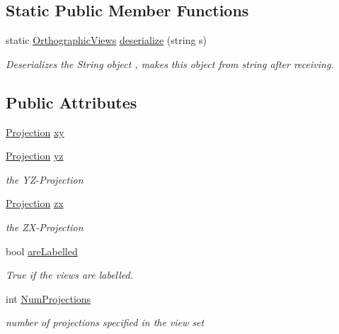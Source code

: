 \subsection*{Static Public Member Functions}
\begin{DoxyCompactItemize}
\item 
static \mbox{\hyperlink{class_orthographic_views}{Orthographic\+Views}} \mbox{\hyperlink{class_orthographic_views_a242a3d205d29bc903936d31d97a5cf4a}{deserialize}} (string s)
\begin{DoxyCompactList}\small\item\em Deserializes the String object , makes this object from string after receiving. \end{DoxyCompactList}\end{DoxyCompactItemize}
\subsection*{Public Attributes}
\begin{DoxyCompactItemize}
\item 
\mbox{\hyperlink{class_projection}{Projection}} \mbox{\hyperlink{class_orthographic_views_aaa57dea71b11b77101a5d8d2af776917}{xy}}
\item 
\mbox{\hyperlink{class_projection}{Projection}} \mbox{\hyperlink{class_orthographic_views_a2d66490dec17aef63631491437e30125}{yz}}
\begin{DoxyCompactList}\small\item\em the Y\+Z-\/\+Projection \end{DoxyCompactList}\item 
\mbox{\hyperlink{class_projection}{Projection}} \mbox{\hyperlink{class_orthographic_views_a4aa367ed88820282a04846786007f153}{zx}}
\begin{DoxyCompactList}\small\item\em the Z\+X-\/\+Projection \end{DoxyCompactList}\item 
bool \mbox{\hyperlink{class_orthographic_views_af414df37b5977b4486b8d0351f142a7f}{are\+Labelled}}
\begin{DoxyCompactList}\small\item\em True if the views are labelled. \end{DoxyCompactList}\item 
int \mbox{\hyperlink{class_orthographic_views_a899ce5fc9774fbf68cd35d2b4bda3d2c}{Num\+Projections}}
\begin{DoxyCompactList}\small\item\em number of projections specified in the view set \end{DoxyCompactList}\end{DoxyCompactItemize}


